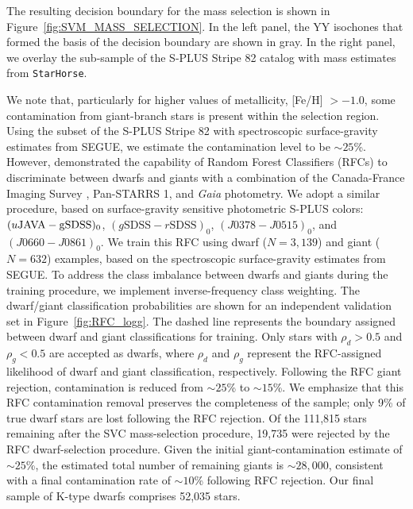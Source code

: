 \documentclass[twocolumn,trackchanges]{aastex63}
\begin{document}
The resulting decision boundary for the mass selection is shown in Figure~\ref{fig:SVM_MASS_SELECTION}. In the left panel, the YY isochones that formed the basis of the decision boundary are shown in gray.
In the right panel, we overlay the sub-sample of the S-PLUS Stripe 82 catalog with mass estimates from \texttt{StarHorse}.

We note that, particularly for higher values of metallicity, [Fe/H] $>-1.0$, some contamination from giant-branch stars is present within the selection region. Using the subset of the S-PLUS Stripe 82 with spectroscopic surface-gravity estimates from SEGUE, we estimate the contamination level to be $\sim 25$\%. However, \citet{Guillaume:2019} demonstrated the capability of Random Forest Classifiers (RFCs) to discriminate between dwarfs and giants with a combination of the Canada-France Imaging Survey \citep{Ibata:2017}, Pan-STARRS 1, and \textit{Gaia} photometry. We adopt a similar procedure, based on surface-gravity sensitive photometric S-PLUS colors: $(u\rm{JAVA} - g\rm{SDSS})_0$, $(g\textrm{SDSS}-r\textrm{SDSS})_0$, $(J0378-J0515)_0$, and $(J0660-J0861)_0$. We train this RFC using dwarf ($N=3,139$) and giant ($N=632$) examples, based on the spectroscopic surface-gravity estimates from SEGUE. To address the class imbalance between dwarfs and giants during the training procedure, we implement inverse-frequency class weighting.
The dwarf/giant classification probabilities are shown for an independent validation set in Figure~\ref{fig:RFC_logg}. The dashed line represents the boundary assigned between dwarf and giant classifications for training. 
Only stars with $\rho_d> 0.5$ and $\rho_g <0.5$ are accepted as dwarfs, where $\rho_d$ and $\rho_g$ represent the RFC-assigned likelihood of dwarf and giant classification, respectively.
Following the RFC giant rejection, contamination is reduced from $\sim  25$\% to $\sim 15$\%. 
We emphasize that this RFC contamination removal preserves the completeness of the sample; only 9\% of true dwarf stars are lost following the RFC rejection. Of the 111,815 stars remaining after the SVC mass-selection procedure, 19,735 were rejected by the RFC  dwarf-selection procedure. Given the initial giant-contamination estimate of $\sim 25$\%, the estimated total number of remaining giants is $\sim 28,000$, consistent with a final contamination rate of $\sim 10$\% following RFC rejection.
Our final sample of K-type dwarfs comprises 52,035 stars.
\end{document}
